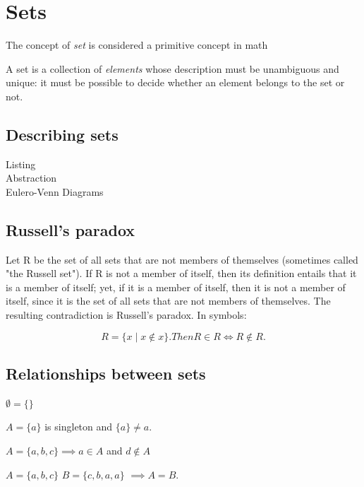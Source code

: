 \section{Sets}
The concept of \emph{set} is considered a primitive concept in math

A set is a collection of \emph{elements} whose description must be
unambiguous and unique: it must be possible to decide whether an
element belongs to the set or not.
\subsection{Describing sets}
\begin{description}
  \item[Listing]
  \item[Abstraction]
  \item[Eulero-Venn Diagrams]
\end{description}

\subsection{Russell's paradox}
{\color{sol}
Let R be the set of all sets that are not members of themselves (sometimes called "the Russell set"). If R is not a member of itself, then its definition entails that it is a member of itself; yet, if it is a member of itself, then it is not a member of itself, since it is the set of all sets that are not members of themselves. The resulting contradiction is Russell's paradox. In symbols:
}

    $$ R=\{x\mid x\not \in x\}.Then {R\in R\iff R\not \in R.}$$

\subsection{Relationships between sets}
\begin{definition}
  $\emptyset = \{  \}$
\end{definition}

\begin{definition}[Singleton $\{ a \}$]
  $A = \{a\}$ is singleton and $\{ a \} \neq a$.
\end{definition}

\begin{definition}
  $A = \{a, b, c\} \implies a \in A$ and $d \notin A$
\end{definition}

\begin{definition}[Set equality $A=B$]
  $A = \{a, b, c\}$ $B=\{c, b, a, a\}$ $\implies A=B$.
\end{definition}

